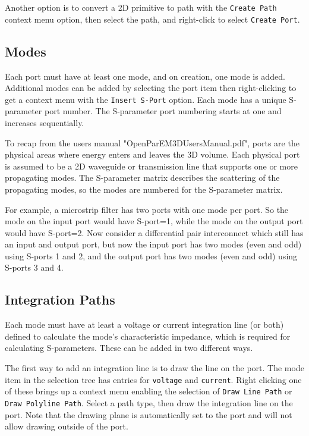 \documentclass[titlepage]{article}
\renewcommand\_{\textunderscore\linebreak[1]}
\begin{document}
Another option is to convert a 2D primitive to path with the \texttt{Create Path} context menu option, then select the path, and right-click to select \texttt{Create Port}.

\subsection{Modes}

Each port must have at least one mode, and on creation, one mode is added.  Additional modes can be added by selecting the port item then right-clicking to get a context menu with the \texttt{Insert S-Port} option. Each mode has a unique S-parameter port number.  The S-parameter port numbering starts at one and increases sequentially.

To recap from the users manual "OpenParEM3D\_Users\_Manual.pdf", ports are the physical areas where energy enters and leaves the 3D volume.  Each physical port is assumed to be a 2D waveguide or transmission line that supports one or more propagating modes.  The S-parameter matrix describes the scattering of the propagating modes, so the modes are numbered for the S-parameter matrix.

For example, a microstrip filter has two ports with one mode per port.  So the mode on the input port would have S-port=1, while the mode on the output port would have S-port=2.  Now consider a differential pair interconnect which still has an input and output port, but now the input port has two modes (even and odd) using S-ports 1 and 2, and the output port has two modes (even and odd) using S-ports 3 and 4.


\subsection{Integration Paths}

Each mode must have at least a voltage or current integration line (or both) defined to calculate the mode's characteristic impedance, which is required for calculating S-parameters.  These can be added in two different ways.

The first way to add an integration line is to draw the line on the port.  The mode item in the selection tree has entries for \texttt{voltage} and \texttt{current}.  Right clicking one of these brings up a context menu enabling the selection of \texttt{Draw Line Path}  or \texttt{Draw Polyline Path}.  Select a path type, then draw the integration line on the port.  Note that the drawing plane is automatically set to the port and will not allow drawing outside of the port.
\end{document}
